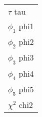 \begin{table}[H]
{\begin{tabular}{l{}}
\rule{0pt}{4ex}$\tau$ {{tau}} \\
$\phi_1$ {{phi1}} \\
$\phi_2$ {{phi2}} \\
$\phi_3$ {{phi3}} \\
$\phi_4$ {{phi4}} \\
$\phi_5$ {{phi5}} \\

\rule{0pt}{4ex}$\chi^2$ {{chi2}} \\

\end{tabular}

}
\label{tab:gen-fit{{year}}}
\end{table}